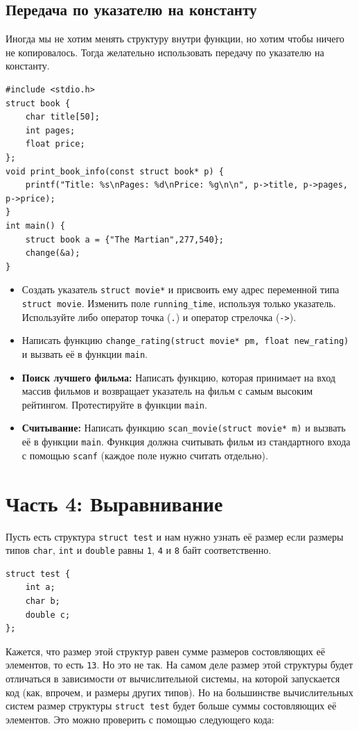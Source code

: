 \documentclass{article}
\begin{document}
\subsection*{Передача по указателю на константу}
Иногда мы не хотим менять структуру внутри функции, но хотим чтобы ничего не копировалось. Тогда желательно использовать передачу по указателю
на константу.
\begin{lstlisting}
#include <stdio.h>
struct book {
    char title[50];
    int pages;
    float price;
};
void print_book_info(const struct book* p) {
    printf("Title: %s\nPages: %d\nPrice: %g\n\n", p->title, p->pages, p->price);
}
int main() {
    struct book a = {"The Martian",277,540};
    change(&a);
}
\end{lstlisting}
\newpage


\begin{itemize}
\item Создать указатель \texttt{struct movie*} и присвоить ему адрес переменной типа \texttt{struct movie}.  Изменить поле \texttt{running\_time}, используя только указатель.  Используйте либо оператор точка (\texttt{.}) и оператор стрелочка (\texttt{->}).
\item Написать функцию \texttt{change\_rating(struct movie* pm, float new\_rating)} и вызвать её в функции \texttt{main}.


\item \textbf{Поиск лучшего фильма:} Написать функцию, которая принимает на вход массив фильмов и возвращает указатель на фильм с самым высоким рейтингом. Протестируйте в функции \texttt{main}.

\item \textbf{Считывание:} Написать функцию \texttt{scan\_movie(struct movie* m)} и вызвать её в функции \texttt{main}. Функция должна считывать фильм  из стандартного входа с помощью \texttt{scanf} (каждое поле нужно считать отдельно).

\end{itemize}


\newpage
\section*{Часть 4: Выравнивание}
Пусть есть структура \texttt{struct test} и нам нужно узнать её размер если размеры типов \texttt{char}, \texttt{int} и \texttt{double} равны \texttt{1}, \texttt{4} и \texttt{8} байт соответственно.
\begin{lstlisting}
struct test {
    int a;
    char b;
    double c;
};
\end{lstlisting}
Кажется, что размер этой структур равен сумме размеров состовляющих её элементов, то есть \texttt{13}. Но это не так. 
На самом деле размер этой структуры будет отличаться в зависимости от вычислительной системы, на которой запускается код (как, впрочем, и размеры других типов). Но на большинстве вычислительных систем размер структуры \texttt{struct test} будет больше суммы состовляющих её элементов. Это можно проверить с помощью следующего кода:
\end{document}
